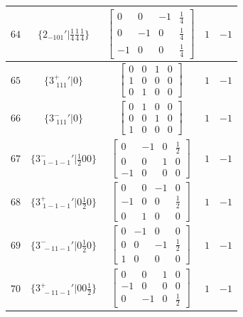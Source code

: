 \documentclass[fleqn,8pt]{jsarticle}
\begin{document}
\begin{longtable}{ccccc}
$ 64 $ & $ \{2{}_{-101}{}'|\frac{1}{4} \frac{1}{4} \frac{1}{4}\} $ & $ \begin{bmatrix} 0 & 0 & -1 & \frac{1}{4} \\ 0 & -1 & 0 & \frac{1}{4} \\ -1 & 0 & 0 & \frac{1}{4} \end{bmatrix} $ & $ 1 $ & $ -1 $ \\ \hline
$ 65 $ & $ \{3^{+}_{\,\,111}{}'|0\} $ & $ \begin{bmatrix} 0 & 0 & 1 & 0 \\ 1 & 0 & 0 & 0 \\ 0 & 1 & 0 & 0 \end{bmatrix} $ & $ 1 $ & $ -1 $ \\ \hline
$ 66 $ & $ \{3^{-}_{\,\,111}{}'|0\} $ & $ \begin{bmatrix} 0 & 1 & 0 & 0 \\ 0 & 0 & 1 & 0 \\ 1 & 0 & 0 & 0 \end{bmatrix} $ & $ 1 $ & $ -1 $ \\ \hline
$ 67 $ & $ \{3^{-}_{\,\,1-1-1}{}'|\frac{1}{2} 0 0\} $ & $ \begin{bmatrix} 0 & -1 & 0 & \frac{1}{2} \\ 0 & 0 & 1 & 0 \\ -1 & 0 & 0 & 0 \end{bmatrix} $ & $ 1 $ & $ -1 $ \\ \hline
$ 68 $ & $ \{3^{+}_{\,\,1-1-1}{}'|0 \frac{1}{2} 0\} $ & $ \begin{bmatrix} 0 & 0 & -1 & 0 \\ -1 & 0 & 0 & \frac{1}{2} \\ 0 & 1 & 0 & 0 \end{bmatrix} $ & $ 1 $ & $ -1 $ \\ \hline
$ 69 $ & $ \{3^{-}_{\,\,-11-1}{}'|0 \frac{1}{2} 0\} $ & $ \begin{bmatrix} 0 & -1 & 0 & 0 \\ 0 & 0 & -1 & \frac{1}{2} \\ 1 & 0 & 0 & 0 \end{bmatrix} $ & $ 1 $ & $ -1 $ \\ \hline
$ 70 $ & $ \{3^{+}_{\,\,-11-1}{}'|0 0 \frac{1}{2}\} $ & $ \begin{bmatrix} 0 & 0 & 1 & 0 \\ -1 & 0 & 0 & 0 \\ 0 & -1 & 0 & \frac{1}{2} \end{bmatrix} $ & $ 1 $ & $ -1 $ \\ \hline

\end{longtable}
\end{document}
